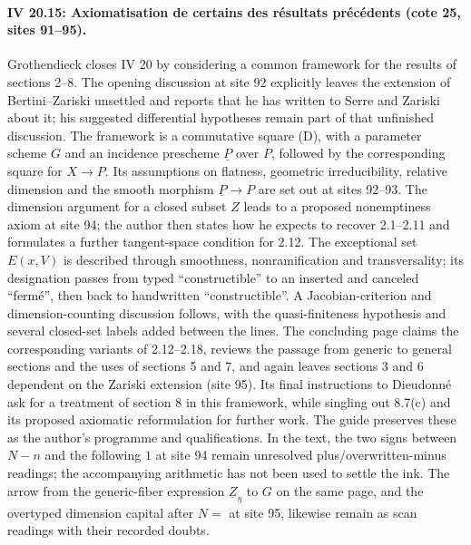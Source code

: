 \paragraph{IV 20.15: Axiomatisation de certains des résultats précédents (cote 25, sites 91--95).}
Grothendieck closes IV 20 by considering a common framework for the results of sections 2--8. The opening discussion at site 92 explicitly leaves the extension of Bertini--Zariski unsettled and reports that he has written to Serre and Zariski about it; his suggested differential hypotheses remain part of that unfinished discussion. The framework is a commutative square (D), with a parameter scheme $G$ and an incidence prescheme $\underline P$ over $P$, followed by the corresponding square for $X\to P$. Its assumptions on flatness, geometric irreducibility, relative dimension and the smooth morphism $\underline P\to P$ are set out at sites 92--93. The dimension argument for a closed subset $Z$ leads to a proposed nonemptiness axiom at site 94; the author then states how he expects to recover 2.1--2.11 and formulates a further tangent-space condition for 2.12. The exceptional set $E(x,V)$ is described through smoothness, nonramification and transversality; its designation passes from typed ``constructible'' to an inserted and canceled ``fermé'', then back to handwritten ``constructible''. A Jacobian-criterion and dimension-counting discussion follows, with the quasi-finiteness hypothesis and several closed-set labels added between the lines. The concluding page claims the corresponding variants of 2.12--2.18, reviews the passage from generic to general sections and the uses of sections 5 and 7, and again leaves sections 3 and 6 dependent on the Zariski extension (site 95). Its final instructions to Dieudonné ask for a treatment of section 8 in this framework, while singling out 8.7(c) and its proposed axiomatic reformulation for further work. The guide preserves these as the author's programme and qualifications. In the text, the two signs between $N-n$ and the following $1$ at site 94 remain unresolved plus/overwritten-minus readings; the accompanying arithmetic has not been used to settle the ink. The arrow from the generic-fiber expression $\underline Z_\eta$ to $G$ on the same page, and the overtyped dimension capital after $N=$ at site 95, likewise remain as scan readings with their recorded doubts.
